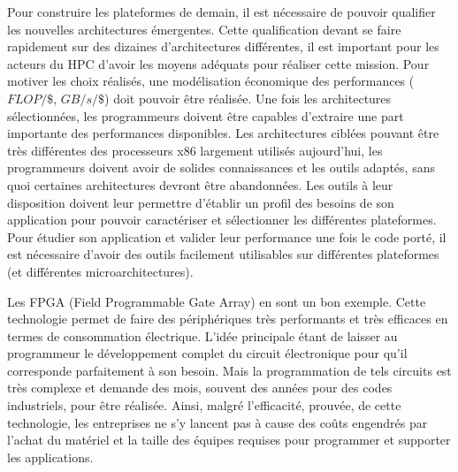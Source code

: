         Pour construire les plateformes de demain, il est nécessaire de pouvoir qualifier les nouvelles architectures émergentes. Cette qualification devant se faire rapidement sur des dizaines d'architectures différentes, il est important pour les acteurs du HPC d'avoir les moyens adéquats pour réaliser cette mission. Pour motiver les choix réalisés, une modélisation économique des performances ($FLOP/\$$, $GB/s/\$$) doit pouvoir être réalisée. Une fois les architectures sélectionnées, les programmeurs doivent être capables d'extraire une part importante des performances disponibles. Les architectures ciblées pouvant être très différentes des processeurs x86 largement utilisés aujourd'hui, les programmeurs doivent avoir de solides connaissances et les outils adaptés, sans quoi certaines architectures devront être abandonnées. Les outils à leur disposition doivent leur permettre d'établir un profil des besoins de son application pour pouvoir caractériser et sélectionner les différentes plateformes. Pour étudier son application et valider leur performance une fois le code porté, il est nécessaire d'avoir des outils facilement utilisables sur différentes plateformes (et différentes microarchitectures).
        
        Les FPGA (Field Programmable Gate Array) en sont un bon exemple. Cette technologie permet de faire des périphériques très performants et très efficaces en termes de consommation électrique. L'idée principale étant de laisser au programmeur le développement complet du circuit électronique pour qu'il corresponde parfaitement à son besoin. Mais la programmation de tels circuits est très complexe et demande des mois, souvent des années pour des codes industriels, pour être réalisée. Ainsi, malgré l'efficacité, prouvée, de cette technologie, les entreprises ne s'y lancent pas à cause des coûts engendrés par l'achat du matériel et la taille des équipes requises pour programmer et supporter les applications. 
        
        
        
